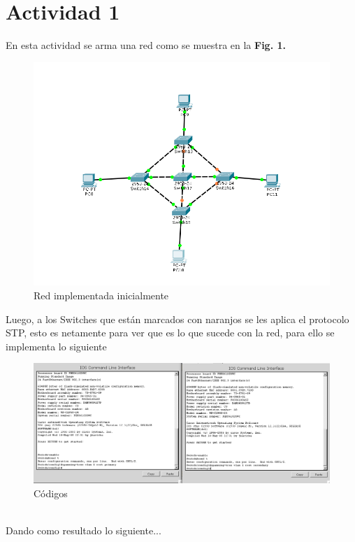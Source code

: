 \documentclass[spanish]{udpreport}
\begin{document}
\section{Actividad 1}
En esta actividad se arma una red como se muestra en la \textbf{Fig. 1.}
\begin{figure}[h]
    \centering
    \includegraphics[scale=0.4]{images/ini.png}
    \caption{Red implementada inicialmente}
    \label{fig:my_label}
\end{figure}
\newpage
Luego, a los Switches que están marcados con naranjos se les aplica el protocolo STP, esto es netamente para ver que es lo que sucede con la red, para ello se implementa lo siguiente
\begin{figure}[h]
    \centering
    \includegraphics[scale=0.3]{images/cod.png}
    \caption{Códigos}
    \label{fig:my_label}
\end{figure}
\\Dando como resultado lo siguiente...
\end{document}
